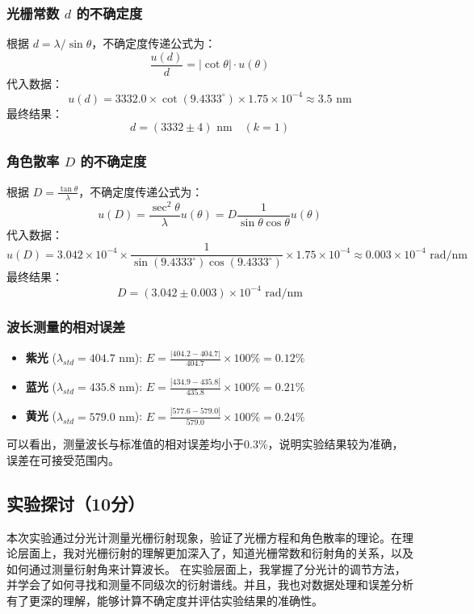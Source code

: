 \documentclass[]{../../templates/Report}%
\begin{document}
\begin{fullreportonly}
\subsubsection{光栅常数 $d$ 的不确定度}
根据 $d = \lambda / \sin \theta$，不确定度传递公式为：
\[
\frac{u(d)}{d} = |\cot \theta| \cdot u(\theta)
\]
代入数据：
\[
u(d) = 3332.0 \times \cot(9.4333^\circ) \times 1.75 \times 10^{-4} \approx 3.5 \text{ nm}
\]
最终结果：
\[
d = (3332 \pm 4) \text{ nm} \quad (k=1)
\]

\subsubsection{角色散率 $D$ 的不确定度}
根据 $D = \frac{\tan \theta}{\lambda}$，不确定度传递公式为：
\[
u(D) = \frac{\sec^2 \theta}{\lambda} u(\theta) = D \frac{1}{\sin\theta \cos\theta} u(\theta)
\]
代入数据：
\[
u(D) = 3.042 \times 10^{-4} \times \frac{1}{\sin(9.4333^\circ)\cos(9.4333^\circ)} \times 1.75 \times 10^{-4} \approx 0.003 \times 10^{-4} \text{ rad/nm}
\]
最终结果：
\[
D = (3.042 \pm 0.003) \times 10^{-4} \text{ rad/nm}
\]


\subsubsection{波长测量的相对误差}
\begin{itemize}
    \item \textbf{紫光} ($\lambda_{std} = 404.7 \text{ nm}$): $E = \frac{|404.2 - 404.7|}{404.7} \times 100\% = 0.12\%$
    \item \textbf{蓝光} ($\lambda_{std} = 435.8 \text{ nm}$): $E = \frac{|434.9 - 435.8|}{435.8} \times 100\% = 0.21\%$
    \item \textbf{黄光} ($\lambda_{std} = 579.0 \text{ nm}$): $E = \frac{|577.6 - 579.0|}{579.0} \times 100\% = 0.24\%$
\end{itemize}

可以看出，测量波长与标准值的相对误差均小于0.3\%，说明实验结果较为准确，误差在可接受范围内。
\subsection{实验探讨（10分）}
本次实验通过分光计测量光栅衍射现象，验证了光栅方程和角色散率的理论。在理论层面上，我对光栅衍射的理解更加深入了，知道光栅常数和衍射角的关系，以及如何通过测量衍射角来计算波长。
在实验层面上，我掌握了分光计的调节方法，并学会了如何寻找和测量不同级次的衍射谱线。并且，我也对数据处理和误差分析有了更深的理解，能够计算不确定度并评估实验结果的准确性。


\end{fullreportonly}
\end{document}

